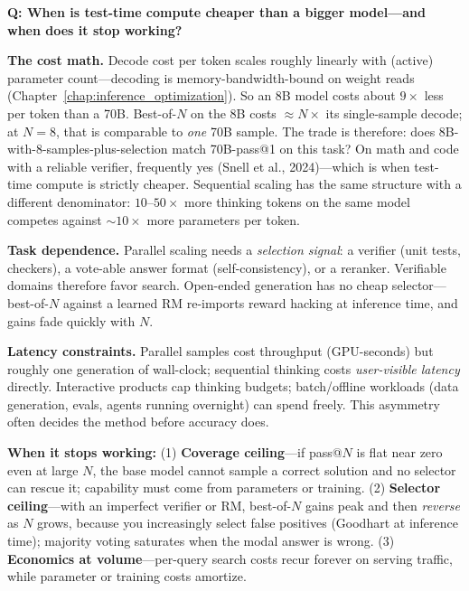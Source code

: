
\begin{interviewq}
\textbf{Q: When is test-time compute cheaper than a bigger model---and when does it stop working?}

 \quad {} \quad \badgefreq{\freqhigh}

\stronganswer

\textbf{The cost math.} Decode cost per token scales roughly linearly with (active) parameter count---decoding is memory-bandwidth-bound on weight reads (Chapter~\ref{chap:inference_optimization}). So an 8B model costs about $9\times$ less per token than a 70B. Best-of-$N$ on the 8B costs $\approx N \times$ its single-sample decode; at $N = 8$, that is comparable to \textit{one} 70B sample. The trade is therefore: does 8B-with-8-samples-plus-selection match 70B-pass@1 on this task? On math and code with a reliable verifier, frequently yes (Snell et al., 2024)---which is when test-time compute is strictly cheaper. Sequential scaling has the same structure with a different denominator: $10$--$50\times$ more thinking tokens on the same model competes against $\sim 10\times$ more parameters per token.

\textbf{Task dependence.} Parallel scaling needs a \textit{selection signal}: a verifier (unit tests, checkers), a vote-able answer format (self-consistency), or a reranker. Verifiable domains therefore favor search. Open-ended generation has no cheap selector---best-of-$N$ against a learned RM re-imports reward hacking at inference time, and gains fade quickly with $N$.

\textbf{Latency constraints.} Parallel samples cost throughput (GPU-seconds) but roughly one generation of wall-clock; sequential thinking costs \textit{user-visible latency} directly. Interactive products cap thinking budgets; batch/offline workloads (data generation, evals, agents running overnight) can spend freely. This asymmetry often decides the method before accuracy does.

\textbf{When it stops working:} (1) \textbf{Coverage ceiling}---if pass@$N$ is flat near zero even at large $N$, the base model cannot sample a correct solution and no selector can rescue it; capability must come from parameters or training. (2) \textbf{Selector ceiling}---with an imperfect verifier or RM, best-of-$N$ gains peak and then \textit{reverse} as $N$ grows, because you increasingly select false positives (Goodhart at inference time); majority voting saturates when the modal answer is wrong. (3) \textbf{Economics at volume}---per-query search costs recur forever on serving traffic, while parameter or training costs amortize.


\end{interviewq}
